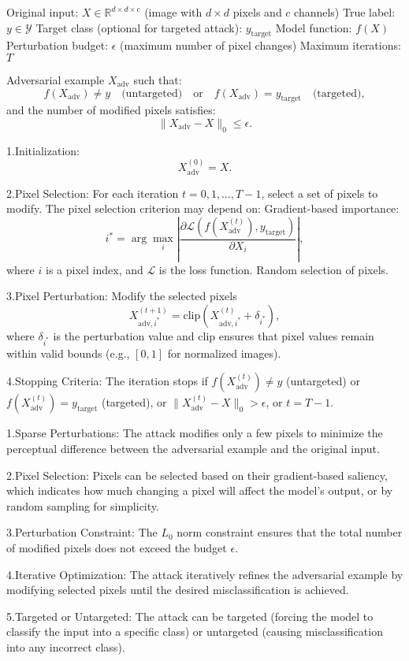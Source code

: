 Original input: $X \in \mathbb{R}^{d \times d \times c}$ (image with $d \times d$ pixels and $c$ channels)
True label: $y \in \mathcal{Y}$
Target class (optional for targeted attack): $y_{\text{target}}$
Model function: $f(X)$
Perturbation budget: $\epsilon$ (maximum number of pixel changes)
Maximum iterations: $T$


Adversarial example $X_{\text{adv}}$ such that:
\[
f(X_{\text{adv}}) \neq y \quad \text{(untargeted)} \quad \text{or} \quad f(X_{\text{adv}}) = y_{\text{target}} \quad \text{(targeted)},
\]
and the number of modified pixels satisfies:
\[
\|X_{\text{adv}} - X\|_0 \leq \epsilon.
\]

1.Initialization:
   \[
   X_{\text{adv}}^{(0)} = X.
   \]

2.Pixel Selection:
For each iteration $t = 0, 1, \dots, T-1$, select a set of pixels to modify. The pixel selection criterion may depend on:
Gradient-based importance:
       \[
       i^* = \arg\max_i \left| \frac{\partial \mathcal{L}(f(X_{\text{adv}}^{(t)}), y_{\text{target}})}{\partial X_i} \right|,
       \]
where $i$ is a pixel index, and $\mathcal{L}$ is the loss function. Random selection of pixels.

3.Pixel Perturbation: Modify the selected pixels
   \[
   X_{\text{adv}, i^*}^{(t+1)} = \text{clip} \left( X_{\text{adv}, i^*}^{(t)} + \delta_{i^*} \right),
   \]
   where $\delta_{i^*}$ is the perturbation value and $\text{clip}$ ensures that pixel values remain within valid bounds (e.g., $[0, 1]$ for normalized images).

4.Stopping Criteria: The iteration stops if  $f(X_{\text{adv}}^{(t)}) \neq y$ (untargeted) or $f(X_{\text{adv}}^{(t)}) = y_{\text{target}}$ (targeted), or $\|X_{\text{adv}}^{(t)} - X\|_0 > \epsilon$, or $t = T-1$.

1.Sparse Perturbations: The attack modifies only a few pixels to minimize the perceptual difference between the adversarial example and the original input.

2.Pixel Selection: Pixels can be selected based on their gradient-based saliency, which indicates how much changing a pixel will affect the model's output, or by random sampling for simplicity.

3.Perturbation Constraint: The $L_0$ norm constraint ensures that the total number of modified pixels does not exceed the budget $\epsilon$.

4.Iterative Optimization: The attack iteratively refines the adversarial example by modifying selected pixels until the desired misclassification is achieved.

5.Targeted or Untargeted: The attack can be targeted (forcing the model to classify the input into a specific class) or untargeted (causing misclassification into any incorrect class).
